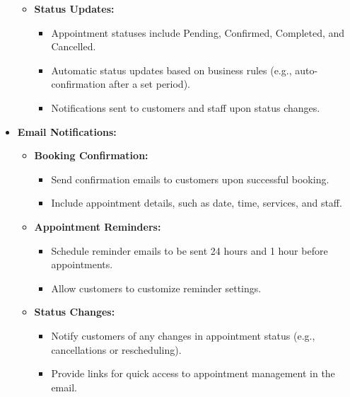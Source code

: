\begin{itemize}[leftmargin=*]
\begin{itemize}
        \item \textbf{Status Updates:}
        \begin{itemize}
            \item Appointment statuses include Pending, Confirmed, Completed, and Cancelled.
            \item Automatic status updates based on business rules (e.g., auto-confirmation after a set period).
            \item Notifications sent to customers and staff upon status changes.
        \end{itemize}
    \end{itemize}
    
    \item \textbf{Email Notifications:}
    \begin{itemize}
        \item \textbf{Booking Confirmation:}
        \begin{itemize}
            \item Send confirmation emails to customers upon successful booking.
            \item Include appointment details, such as date, time, services, and staff.
        \end{itemize}
        
        \item \textbf{Appointment Reminders:}
        \begin{itemize}
            \item Schedule reminder emails to be sent 24 hours and 1 hour before appointments.
            \item Allow customers to customize reminder settings.
        \end{itemize}
        
        \item \textbf{Status Changes:}
        \begin{itemize}
            \item Notify customers of any changes in appointment status (e.g., cancellations or rescheduling).
            \item Provide links for quick access to appointment management in the email.
        \end{itemize}
    \end{itemize}
\end{itemize}


